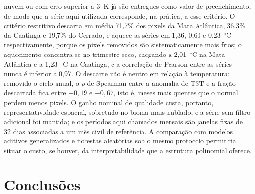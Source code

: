 \documentclass[a4paper,fleqn]{cas-sc}
\begin{document}
nuvem ou com erro superior a 3~K já são entregues como valor de preenchimento, de modo que a série aqui utilizada corresponde, na prática, a esse critério. O critério restritivo descarta em média 71,7\% dos pixels da Mata Atlântica, 36,3\% da Caatinga e 19,7\% do Cerrado, e aquece as séries em 1,36, 0,60 e 0,23~$^{\circ}$C respectivamente, porque os pixels removidos são sistematicamente mais frios; o aquecimento concentra-se no trimestre seco, chegando a 2,01~$^{\circ}$C na Mata Atlântica e a 1,23~$^{\circ}$C na Caatinga, e a correlação de Pearson entre as séries nunca é inferior a 0,97. O descarte não é neutro em relação à temperatura: removido o ciclo anual, o $\rho$ de Spearman entre a anomalia de TST e a fração descartada fica entre $-0{,}19$ e $-0{,}67$, isto é, meses mais quentes que o normal perdem menos pixels. O ganho nominal de qualidade custa, portanto, representatividade espacial, sobretudo no bioma mais nublado, e a série sem filtro adicional foi mantida; e os períodos aqui chamados mensais são janelas fixas de 32 dias associadas a um mês civil de referência. A comparação com modelos aditivos generalizados e florestas aleatórias sob o mesmo protocolo permitiria situar o custo, se houver, da interpretabilidade que a estrutura polinomial oferece.

\section{Conclusões}\label{sec:conclusions}
\end{document}
